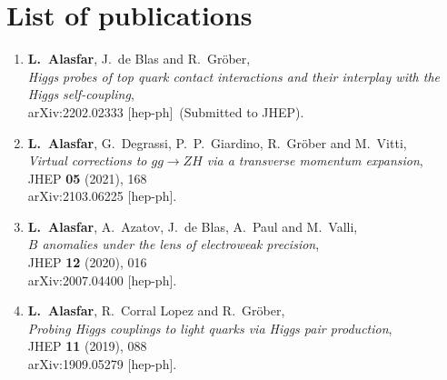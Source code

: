 
\chapter*{List of publications}
\begin{enumerate}
	\item \textbf{L.~Alasfar}, J.~de Blas and R.~Gr\"ober,\\
	\textit{Higgs probes of top quark contact interactions and their interplay with the Higgs self-coupling}, \\
	arXiv:2202.02333 [hep-ph]~(Submitted to JHEP).
 \item \textbf{L.~Alasfar}, G.~Degrassi, P.~P.~Giardino, R.~Gr\"ober and M.~Vitti,\\
 \textit{Virtual corrections to $gg\to ZH$ via a transverse momentum expansion},\\
 JHEP \textbf{05} (2021), 168\\ arXiv:2103.06225 [hep-ph].
\item \textbf{L.~Alasfar}, A.~Azatov, J.~de Blas, A.~Paul and M.~Valli,\\
\textit{$B$ anomalies under the lens of electroweak precision},\\
JHEP \textbf{12} (2020), 016\\
arXiv:2007.04400 [hep-ph].
\item \textbf{L.~Alasfar}, R.~Corral Lopez and R.~Gr\"ober,\\
\textit{Probing Higgs couplings to light quarks via Higgs pair production},\\
JHEP \textbf{11} (2019), 088\\
arXiv:1909.05279 [hep-ph].
\end{enumerate}%

%

